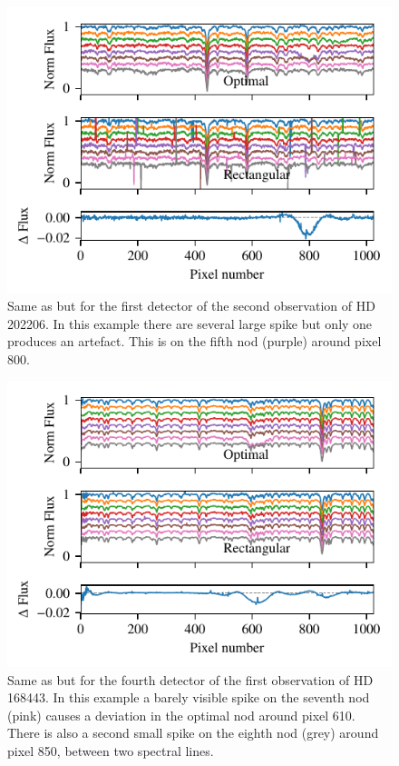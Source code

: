  \begin{figure}
    \centering
    \includegraphics[width=0.7\linewidth]{figures/appendix/bp_plots/extraction_comparision_HD202206-2_chip_1}
    \caption{Same as  but for the first detector of the second observation of  {HD\,202206}. In this example there are several large spike but only one produces an artefact. This is on the fifth nod (purple) around pixel 800.}
    \label{fig:artefact_example4}
\end{figure}
 \begin{figure}
     \centering
     \includegraphics[width=0.7\linewidth]{figures/appendix/bp_plots/extraction_comparision_HD168443-1_chip_4}
     \caption{Same as  but for the fourth detector of the first observation of {HD\,168443}. In this example a barely visible spike on the seventh nod (pink) causes a deviation in the optimal nod around pixel 610. There is also a second small spike on the eighth  nod (grey) around pixel 850, between two spectral lines.}
     \label{fig:artefact_example5}
 \end{figure}

